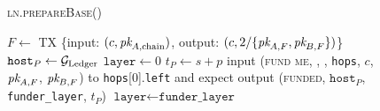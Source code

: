 \begin{figure}[H]
  \begin{processbox}{\textsc{ln.prepareBase}()}
    \begin{algorithmic}[1]
       
        \State $F \gets$ TX \{input: $(c, \textit{pk}_{A, \mathrm{chain}})$, output: $(c,
        2/\{\textit{pk}_{A, F}, \textit{pk}_{B, F}\})$\}
        \label{code:ln:base:create-funding}
        \State $\texttt{host}_P \gets \mathcal{G}_{\mathrm{Ledger}}$
        \State $\texttt{layer} \gets 0$
        \State $t_P \gets s + p$
      \Else \: 
        \State input (\textsc{fund me}, \alice, \bob, \texttt{hops}, $c$,
        $\textit{pk}_{A, F}$, $\textit{pk}_{B, F}$) to \texttt{hops}[0].\texttt{left} and expect
        output (\textsc{funded}, $\texttt{host}_P$, \texttt{funder\_layer},
        $t_P$) 
        \label{code:ln:prepare-base:fund-me}
        \State $\texttt{layer} \gets \texttt{funder\_layer}$
      \EndIf
    \end{algorithmic}
  \end{processbox}
  \caption{}
  \label{code:ln:prepare-base}
\end{figure}


